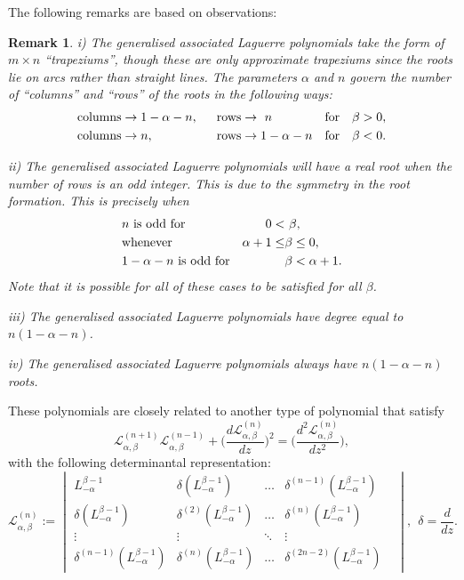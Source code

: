 \documentclass[12pt]{article}
\def\L{\mathcal{L}}
\newtheorem{mydef3}{Remark}[section]
\numberwithin{figure}{section}
\numberwithin{equation}{section}
\numberwithin{table}{section}
\begin{document}
The following remarks are based on observations:
\begin{mydef3}
\item[i)]
The generalised associated Laguerre polynomials take the form of $m\times n$ ``trapeziums'', though these are only approximate trapeziums since the roots lie on arcs rather than straight lines. The parameters $\alpha$ and $n$ govern the number of ``columns'' and ``rows'' of the roots in the following ways:
\begin{align*}
{\rm{columns}} &\rightarrow 1-\alpha-n,~~&{\rm{rows}}& \rightarrow ~n &{\rm{for}}& &\beta&>0,\\
{\rm{columns}} &\rightarrow n,~~&{\rm{rows}}& \rightarrow 1-\alpha-n  &{\rm{for}}& &\beta&<0.
\end{align*}
\item[ii)]
The generalised associated Laguerre polynomials will have a real root when the number of rows is an odd integer. This is due to the symmetry in the root formation. This is precisely when
\begin{align*}
&n~{\rm{is~odd~for}}& 0<&~\beta,\\
&{\rm{whenever}}& \alpha+1\leq&\beta\leq0,\\
&1-\alpha-n~{\rm{is~odd~for}}& &\beta<\alpha+1.
\end{align*}Note that it is possible for all of these cases to be satisfied for all $\beta$.
\item[iii)]
The generalised associated Laguerre polynomials have degree equal to $n(1-\alpha-n)$.
\item[iv)]
The generalised associated Laguerre polynomials always have $n(1-\alpha-n)$ roots.
\end{mydef3}
These polynomials are closely related to another type of polynomial that satisfy
$$
{\L}_{\alpha,\beta}^{(n+1)}{\L}_{\alpha,\beta}^{(n-1)}+\bigg(\frac{d{\L}_{\alpha,\beta}^{(n)}}{dz}\bigg)^2=
\bigg(\frac{d^2{\L}_{\alpha,\beta}^{(n)}}{dz^2}\bigg),
$$
with the following determinantal representation:
\begin{equation}
\L^{(n)}_{\alpha,\beta}:=\begin{vmatrix}
L^{\beta-1}_{-\alpha} & \delta(L^{\beta-1}_{-\alpha})   &\hdots& \delta^{(n-1)}(L^{\beta-1}_{-\alpha}) \\
\delta(L^{\beta-1}_{-\alpha}) & \delta^{(2)}(L^{\beta-1}_{-\alpha}) &\hdots& \delta^{(n)}(L^{\beta-1}_{-\alpha})  \\
\vdots &\vdots &\ddots &\vdots & \\
\delta^{(n-1)}(L^{\beta-1}_{-\alpha}) & \delta^{(n)}(L^{\beta-1}_{-\alpha}) &\hdots& \delta^{(2n-2)}(L^{\beta-1}_{-\alpha})
\end{vmatrix},~~\delta=\frac{d}{dz}.\label{L33}
\end{equation}
\end{document}
